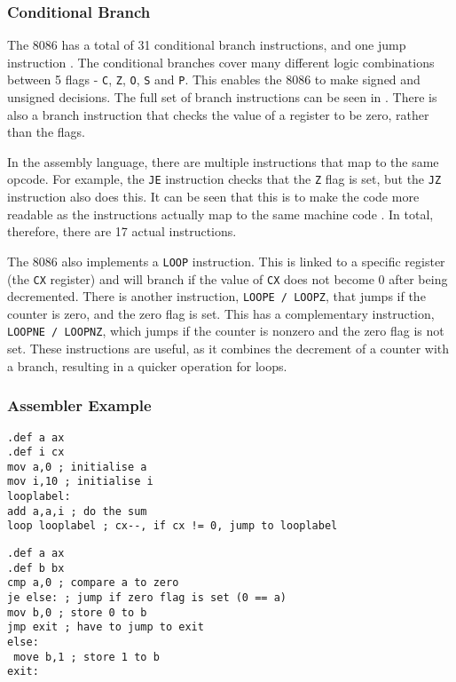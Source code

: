 \documentclass[12pt,a4paper]{article}
\begin{document}
\begin{bibunit}[is-unsrt]
\subsubsection{Conditional Branch}

The 8086 has a total of 31 conditional branch instructions, and one jump instruction \cite{Intel:instructionset}.
The conditional branches cover many different logic combinations between 5 flags - \texttt{C}, \texttt{Z}, \texttt{O}, \texttt{S} and \texttt{P}.
This enables the 8086 to make signed and unsigned decisions.
The full set of branch instructions can be seen in \cite{Intel:condjumps}.
There is also a branch instruction that checks the value of a register to be zero, rather than the flags. 

In the assembly language, there are multiple instructions that map to the same opcode.
For example, the \texttt{JE} instruction checks that the \texttt{Z} flag is set, but the \texttt{JZ} instruction also does this.
It can be seen that this is to make the code more readable as the instructions actually map to the same machine code \cite{Intel:datasheet}.
In total, therefore, there are 17 actual instructions.

The 8086 also implements a \texttt{LOOP} instruction.
This is linked to a specific register (the \texttt{CX} register) and will branch if the value of \texttt{CX} does not become $0$ after being decremented.
There is another instruction, \texttt{LOOPE / LOOPZ}, that jumps if the counter is zero, and the zero flag is set. 
This has a complementary instruction, \texttt{LOOPNE / LOOPNZ}, which jumps if the counter is nonzero and the zero flag is not set.
These instructions are useful, as it combines the decrement of a counter with a branch, resulting in a quicker operation for loops.


\subsubsection{Assembler Example}
\begin{lstlisting}[frame=single,caption=Intel 8086 assembler for listing \ref{ListC},label=intel1]
.def a ax
.def i cx
mov a,0 ; initialise a
mov i,10 ; initialise i
looplabel: 
add a,a,i ; do the sum
loop looplabel ; cx--, if cx != 0, jump to looplabel
\end{lstlisting}

\begin{lstlisting}[frame=single,caption=Intel 8086 assembler for listing \ref{ListC2},label=intel2]
.def a ax
.def b bx
cmp a,0 ; compare a to zero
je else: ; jump if zero flag is set (0 == a)
mov b,0 ; store 0 to b
jmp exit ; have to jump to exit
else:
 move b,1 ; store 1 to b
exit:


\end{lstlisting}
\end{bibunit}
\end{document}
